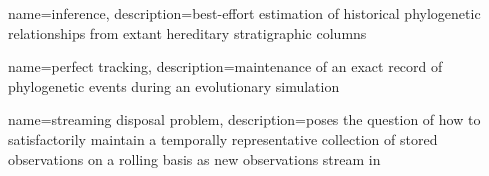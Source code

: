 {
    name=inference,
    description={best-effort estimation of historical phylogenetic relationships from extant hereditary stratigraphic columns}
}

{
    name=perfect tracking,
    description={maintenance of an exact record of phylogenetic events during an evolutionary simulation}
}

{
    name=streaming disposal problem,
    description={poses the question of how to satisfactorily maintain a temporally representative collection of stored observations on a rolling basis as new observations stream in}
}

